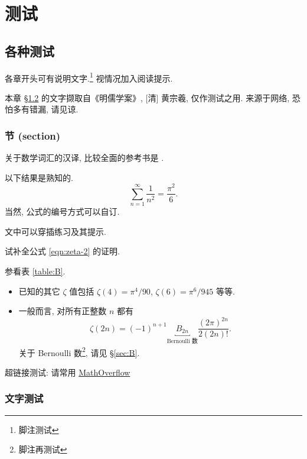 \documentclass[
	draftmark = true,   %
	fontsetup = font-setup-open.tex,
	titlesetup = titles-setup.tex
]{AJbook}
\numberwithin{equation}{section}
\begin{document}
	\part{测试}
	\chapter{各种测试}
	各章开头可有说明文字.\footnote{脚注测试} 视情况加入阅读提示.
	\begin{wenxintishi}
		本章 \S\ref{sec:words} 的文字撷取自《明儒学案》, [清] 黄宗羲, 仅作测试之用. 来源于网络, 恐怕多有错漏, 请见谅. 
	\end{wenxintishi}

	\section{节 (section)}
	关于数学词汇的汉译, 比较全面的参考书是 \cite{ZG}.
	\begin{theorem}[L.\ Euler]
		以下结果是熟知的.
		\begin{equation}\label{eqn:zeta-2}
			\sum_{n=1}^\infty \frac{1}{n^2} = \frac{\pi^2}{6}.
		\end{equation}
		当然, 公式的编号方式可以自订.
	\end{theorem}

	文中可以穿插练习及其提示.
	\begin{exercise}\label{exo:Euler}
		试补全公式 \eqref{eqn:zeta-2} 的证明. \begin{hint} 参看表 \ref{table:B}.\end{hint}
	\end{exercise}

	\begin{itemize}
		\item 已知的其它 $\zeta$ 值包括 $\zeta(4) = \pi^4/90$, $\zeta(6) = \pi^6/945$ 等等.
		\item 一般而言, 对所有正整数 $n$ 都有
		\begin{equation}
			\zeta(2n) = (-1)^{n+1} \underbracket{B_{2n}}_{\text{Bernoulli 数}} \frac{(2\pi)^{2n}}{2(2n)!}.
		\end{equation}
		关于 Bernoulli 数\footnote{脚注再测试}, 请见 \S\ref{sec:B}.
	\end{itemize}

	超链接测试: 请常用 \href{http://mathoverflow.net}{MathOverflow}

	\section{文字测试}\label{sec:words}
\end{document}
